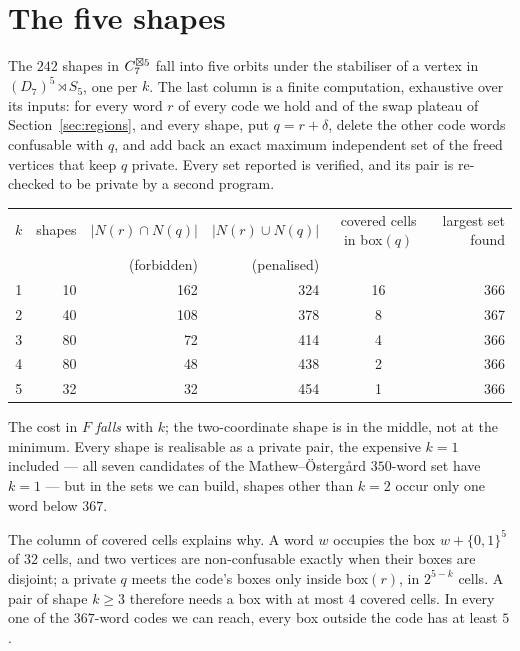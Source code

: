 \section{The five shapes}
\label{sec:shapes}

The $242$ shapes in $C_7^{\boxtimes 5}$ fall into five orbits under the stabiliser of a vertex in
$(D_7)^5\rtimes S_5$, one per $k$. The last column is a finite computation, exhaustive over
its inputs: for every word $r$ of every code we hold and of the swap plateau of
Section~\ref{sec:regions}, and every shape, put $q=r+\delta$, delete the other code words
confusable with $q$, and add back an exact maximum independent set of the freed vertices that
keep $q$ private. Every set reported is verified, and its pair is re-checked to be private by
a second program.

\begin{center}\small
\begin{tabular}{@{}crrrcr@{}}
\toprule
$k$ & shapes & $|N(r)\cap N(q)|$ & $|N(r)\cup N(q)|$ & covered cells in box$(q)$ & largest set found \\
 & & (forbidden) & (penalised) & & \\
\midrule
1 & 10 & 162 & 324 & 16 & 366 \\
2 & 40 & 108 & 378 & 8  & 367 \\
3 & 80 & 72  & 414 & 4  & 366 \\
4 & 80 & 48  & 438 & 2  & 366 \\
5 & 32 & 32  & 454 & 1  & 366 \\
\bottomrule
\end{tabular}
\end{center}

The cost in $F$ \emph{falls} with $k$; the two-coordinate shape is in the middle, not at the
minimum. Every shape is realisable as a private pair, the expensive $k=1$ included --- all seven
candidates of the Mathew--\"Osterg{\aa}rd $350$-word set \cite{mathew2017} have $k=1$ --- but
in the sets we can build, shapes other than $k=2$ occur only one word below $367$.

The column of covered cells explains why. A word $w$ occupies the box $w+\{0,1\}^5$ of $32$
cells, and two vertices are non-confusable exactly when their boxes are disjoint; a private
$q$ meets the code's boxes only inside box$(r)$, in $2^{5-k}$ cells. A pair of shape $k\ge3$
therefore needs a box with at most $4$ covered cells. In every one of the $367$-word codes we
can reach, every box outside the code has at least $5$.

